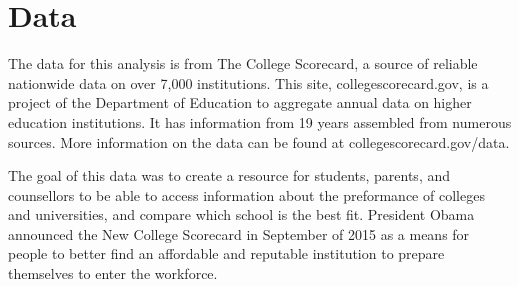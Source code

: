 \section{Data}

The data for this analysis is from The College Scorecard, a source of reliable nationwide data on over 7,000 institutions. This site, collegescorecard.gov, is a project of the Department of Education to aggregate annual data on higher education institutions. It has information from 19 years assembled from numerous sources. More information on the data can be found at collegescorecard.gov/data. 

The goal of this data was to create a resource for students, parents, and counsellors to be able to access information about the preformance of colleges and universities, and compare which school is the best fit. President Obama announced the New College Scorecard in September of 2015 as a means for people to better find an affordable and reputable institution to prepare themselves to enter the workforce. 
